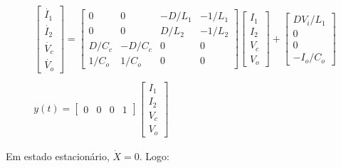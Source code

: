 \documentclass[
        12pt,
        openany, %
        oneside, %
        a4paper,			
        english,			
        brazil
        ]{abntbibufjf}
\begin{document}
\begin{equation}
\begin{array}{cc}
\begin{bmatrix}\dot{I_1} \\\dot{I_2} \\\dot{V_c} \\\dot{V_o}\end{bmatrix}=\begin{bmatrix}0&0&-D/L_1&-1/L_1 \\ 0&0&D/L_2&-1/L_2 \\ D/C_c&-D/C_c&0&0 \\ 1/C_o&1/C_o&0&0\end{bmatrix}\begin{bmatrix}I_1 \\I_2 \\V_c \\V_o
\end{bmatrix}+\begin{bmatrix}DV_i/L_1\\0\\0\\-I_o/C_o\end{bmatrix}\\\\
y(t)=\begin{bmatrix} 0&0&0&1 \end{bmatrix}\begin{bmatrix} I_1 \\I_2 \\V_c \\V_o\end{bmatrix}
\end{array}
\end{equation}


%


Em estado estacionário, $\dot{X}=0$. Logo:
\end{document}

